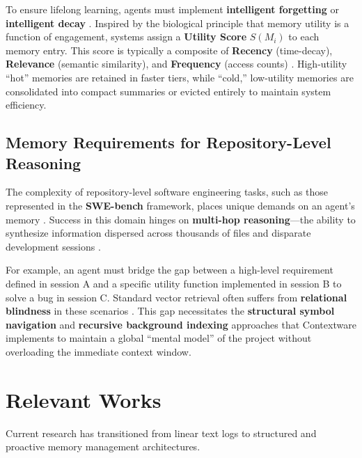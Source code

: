 \documentclass[conference]{IEEEtran}
\begin{document}
To ensure lifelong learning, agents must implement \textbf{intelligent forgetting} or \textbf{intelligent decay} \cite{Kang2025Memory} \cite{Xu2025Memory}. Inspired by the biological principle that memory utility is a function of engagement, systems assign a \textbf{Utility Score} $S(M_i)$ to each memory entry. This score is typically a composite of \textbf{Recency} (time-decay), \textbf{Relevance} (semantic similarity), and \textbf{Frequency} (access counts) \cite{Kang2025Memory} \cite{Kang2025Memory}. High-utility ``hot'' memories are retained in faster tiers, while ``cold,'' low-utility memories are consolidated into compact summaries or evicted entirely to maintain system efficiency.

\subsection{Memory Requirements for Repository-Level Reasoning}
The complexity of repository-level software engineering tasks, such as those represented in the \textbf{SWE-bench} framework, places unique demands on an agent's memory \cite{Jimenez2023SWEbench}. Success in this domain hinges on \textbf{multi-hop reasoning}---the ability to synthesize information dispersed across thousands of files and disparate development sessions \cite{Jimenez2023SWEbench} \cite{Anokhin2024AriGraph:}. 

For example, an agent must bridge the gap between a high-level requirement defined in session A and a specific utility function implemented in session B to solve a bug in session C. Standard vector retrieval often suffers from \textbf{relational blindness} in these scenarios . This gap necessitates the \textbf{structural symbol navigation} and \textbf{recursive background indexing} approaches that Contextware implements to maintain a global ``mental model'' of the project without overloading the immediate context window.

\section{Relevant Works}
Current research has transitioned from linear text logs to structured and proactive memory management architectures.
\end{document}
